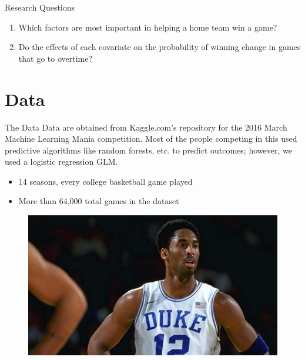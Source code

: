 \documentclass{beamer}
\begin{document}
\begin{frame}{Research Questions}
\begin{enumerate}
	\item %
	Which factors are most important in helping a home team win a game?
	\item %
	Do the effects of each covariate on the probability of winning change in games that go to overtime?
\end{enumerate}
	
\end{frame}

	
\section{Data}
\begin{frame}{The Data}
	Data are obtained from Kaggle.com's repository for the 2016 March Machine Learning Mania competition. Most of the people competing in this used predictive algorithms like random forests, etc. to predict outcomes; however, we used a logistic regression GLM. 
		\\
		\begin{itemize}
			\item 14 seasons, every college basketball game played
			\item More than 64,000 total games in the dataset  
						
		\end{itemize}
	
	\begin{figure}
		\includegraphics[width = 200 pt]{fakekobe.jpg}
	\end{figure}
	
\end{frame}
\end{document}
